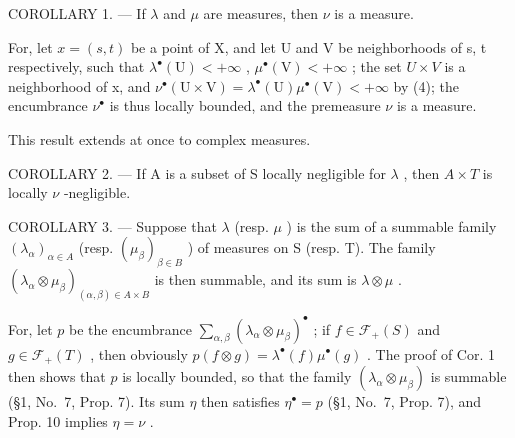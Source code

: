 COROLLARY 1. --- If \(\lambda\) and \(\mu\) are measures, then \(\nu\) is a measure.

For, let \(x = (s, t)\) be a point of X, and let U and V be neighborhoods of s, t respectively, such that \(\lambda^{\bullet}(\mathrm{U}) < +\infty\) , \(\mu^{\bullet}(\mathrm{V}) < +\infty\) ; the set \(U \times V\) is a neighborhood of x, and \(\nu^{\bullet}(\mathrm{U} \times \mathrm{V}) = \lambda^{\bullet}(\mathrm{U}) \mu^{\bullet}(\mathrm{V}) < +\infty\) by (4); the encumbrance \(\nu^{\bullet}\) is thus locally bounded, and the premeasure \(\nu\) is a measure.

This result extends at once to complex measures.

COROLLARY 2. --- If A is a subset of S locally negligible for \(\lambda\) , then \(A \times T\) is locally \(\nu\) -negligible.

COROLLARY 3. --- Suppose that \(\lambda\) (resp. \(\mu\) ) is the sum of a summable family \((\lambda_{\alpha})_{\alpha \in A}\) (resp. \((\mu_{\beta})_{\beta \in B}\) ) of measures on S (resp. T). The family \((\lambda_{\alpha} \otimes \mu_{\beta})_{(\alpha, \beta) \in A \times B}\) is then summable, and its sum is \(\lambda \otimes \mu\) .

For, let \(p\) be the encumbrance \(\sum_{\alpha, \beta} (\lambda_{\alpha} \otimes \mu_{\beta})^{\bullet}\) ; if \(f \in \mathcal{F}_{+}(S)\) and \(g \in \mathcal{F}_{+}(T)\) , then obviously \(p(f \otimes g) = \lambda^{\bullet}(f)\mu^{\bullet}(g)\) . The proof of Cor. 1 then shows that \(p\) is locally bounded, so that the family \((\lambda_{\alpha} \otimes \mu_{\beta})\) is summable (§1, No.~7, Prop. 7). Its sum \(\eta\) then satisfies \(\eta^{\bullet} = p\) (§1, No.~7, Prop. 7), and Prop. 10 implies \(\eta = \nu\) .

